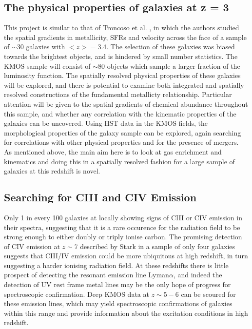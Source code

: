 \documentclass{literature}
\begin{document}
\subsection{The physical properties of galaxies at z = 3}\label{subsec:redshift_three_sample}
This project is similar to that of Troncoso et al. \citep{Troncoso_2014}, in which the authors studied the spatial gradients in metallicity, SFRs and velocity across the face of a sample of $\sim 30$ galaxies with $<z> = 3.4$. The selection of these galaxies was biased towards the brightest objects, and is hindered by small number statistics. The KMOS sample will consist of $\sim 80$ objects which sample a larger fraction of the luminosity function. The spatially resolved physical properties of these galaxies will be explored, and there is potential to examine both integrated and spatially resolved constructions of the fundamental metallicty relationship. Particular attention will be given to the spatial gradients of chemical abundance throughout this sample, and whether any correlation with the kinematic properties of the galaxies can be uncovered. Using HST data in the KMOS fields, the morphological properties of the galaxy sample can be explored, again searching for correlations with other physical properties and for the presence of mergers. \\ 
As mentioned above, the main aim here is to look at gas enrichment and kinematics and doing this in a spatially resolved fashion for a large sample of galaxies at this redshift is novel.     




\subsection{Searching for CIII and CIV Emission}\label{subsec:CIV_emission}
Only 1 in every 100 galaxies at locally showing signs of CIII or CIV emission in their spectra, suggesting that it is a rare occurence for the radiation field to be strong enough to either doubly or triply ionise carbon. The promising detection of CIV emission at $z \sim 7$ described by Stark \citep{Stark2015} in a sample of only four galaxies suggests that CIII/IV emission could be more ubiquitous at high redshift, in turn suggesting a harder ionising radiation field. At these redshifts there is little prospect of detecting the resonant emission line Lyman$\alpha$, and indeed the detection of UV rest frame metal lines may be the only hope of progress for spectroscopic confirmation. Deep KMOS data at $z\sim 5-6$ can be scoured for these emission lines, which may yield spectroscopic confirmations of galaxies within this range and provide information about the excitation conditions in high redshift. 
\end{document}
